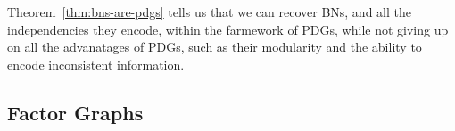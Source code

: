 \documentclass{article}
\newcommand{\commentout}[1]{\ignorespaces}
\DeclarePairedDelimiter{\UD}{\llbracket}{\rrbracket^*}
\numberwithin{equation}{section}
\begin{document}
Theorem~\ref{thm:bns-are-pdgs} tells us that we can recover BNs, and
all the independencies they encode, within the farmework of PDGs,
while not giving up on all the advanatages of PDGs, such as their
modularity and the ability to encode inconsistent information.
        
        \commentout{
        \begin{coro}
		Let $\cal B$ be a BN. For any $\gamma > 0$, and vector of positive numbers $\vec \beta > \vec 0$, 
		\[ \UD[\Big]{\Gamma(\mathcal B), \vec{1}, \vec \beta}_\gamma = \Pr\nolimits_{\cal B} \]
	\end{coro}
	The corollary extends \Cref{thm:bns-are-pdgs} through the other two semantics, showing that the result is not sensitive to the additional parameters ($\beta, \gamma$), and works for the default value of $\alpha = 1$.
	This is true for PDGs which are structurally just subsets of BNs, where every node has at most one incoming edge. In such a structure, every cpt can be simultaneously attained perfectly regardless of how little you are attached to them ($\beta$) and the strength of the bias towards uncertainty $(\gamma)$.
	However, not all PDGs have the particularly nice structure,
        and these parameters will be important once there starts to be
        possible conflict between beliefs.  
}

	

	

	
	\subsection{Factor Graphs} \label{sec:factor-graphs}

\end{document}

